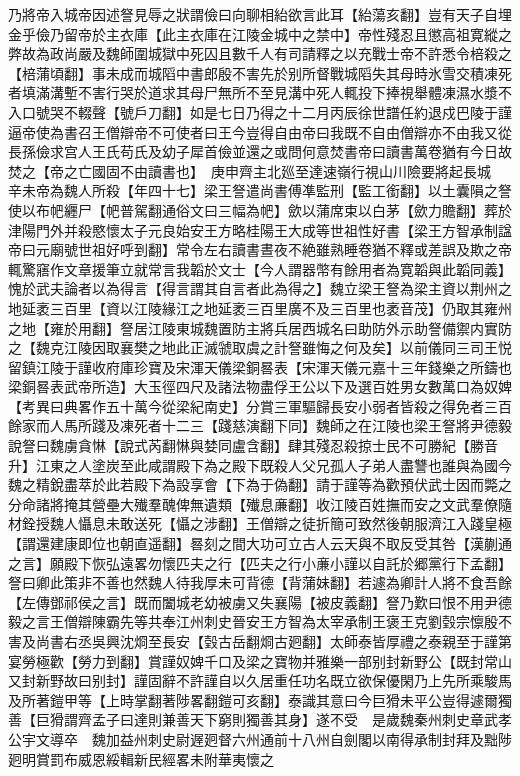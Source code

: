 乃將帝入城帝因述詧見辱之狀謂儉曰向聊相紿欲言此耳【紿蕩亥翻】豈有天子自埋金乎儉乃留帝於主衣庫【此主衣庫在江陵金城中之禁中】帝性殘忍且懲高祖寛縱之弊故為政尚嚴及魏師圍城獄中死囚且數千人有司請釋之以充戰士帝不許悉令棓殺之【棓蒲頃翻】事未成而城䧟中書郎殷不害先於别所督戰城䧟失其母時氷雪交積凍死者填滿溝塹不害行哭於道求其母尸無所不至見溝中死人輒投下捧視舉體凍濕水漿不入口號哭不輟聲【號戶刀翻】如是七日乃得之十二月丙辰徐世譜任約退戍巴陵于謹逼帝使為書召王僧辯帝不可使者曰王今豈得自由帝曰我既不自由僧辯亦不由我又從長孫儉求宫人王氏苟氏及幼子犀首儉並還之或問何意焚書帝曰讀書萬卷猶有今日故焚之【帝之亡國固不由讀書也】　庚申齊主北廵至達速嶺行視山川險要將起長城　辛未帝為魏人所殺【年四十七】梁王詧遣尚書傅凖監刑【監工銜翻】以土囊隕之詧使以布帊纒尸【帊普駕翻通俗文曰三幅為帊】歛以蒲席束以白茅【歛力贍翻】葬於津陽門外并殺愍懷太子元良始安王方略桂陽王大成等世祖性好書【梁王方智承制諡帝曰元廟號世祖好呼到翻】常令左右讀書晝夜不絶雖熟睡卷猶不釋或差誤及欺之帝輒驚窹作文章援筆立就常言我韜於文士【今人謂器幣有餘用者為寛韜與此韜同義】愧於武夫論者以為得言【得言謂其自言者此為得之】魏立梁王詧為梁主資以荆州之地延袤三百里【資以江陵緣江之地延袤三百里廣不及三百里也袤音茂】仍取其雍州之地【雍於用翻】詧居江陵東城魏置防主將兵居西城名曰助防外示助詧備禦内實防之【魏克江陵因取襄樊之地此正滅虢取虞之計詧雖悔之何及矣】以前儀同三司王悦留鎮江陵于謹收府庫珍寶及宋渾天儀梁銅晷表【宋渾天儀元嘉十三年錢樂之所鑄也梁銅晷表武帝所造】大玉徑四尺及諸法物盡俘王公以下及選百姓男女數萬口為奴婢　【考異曰典畧作五十萬今從梁紀南史】分賞三軍驅歸長安小弱者皆殺之得免者三百餘家而人馬所踐及凍死者十二三【踐慈演翻下同】魏師之在江陵也梁王詧將尹德毅說詧曰魏虜貪惏【說式芮翻惏與婪同盧含翻】肆其殘忍殺掠士民不可勝紀【勝音升】江東之人塗炭至此咸謂殿下為之殿下既殺人父兄孤人子弟人盡讐也誰與為國今魏之精銳盡萃於此若殿下為設享會【下為于偽翻】請于謹等為歡預伏武士因而斃之分命諸將掩其營壘大殱羣醜俾無遺類【殱息亷翻】收江陵百姓撫而安之文武羣僚隨材銓授魏人懾息未敢送死【懾之涉翻】王僧辯之徒折簡可致然後朝服濟江入踐皇極【謂還建康即位也朝直遥翻】晷刻之間大功可立古人云天與不取反受其咎【漢蒯通之言】願殿下恢弘遠畧勿懷匹夫之行【匹夫之行小亷小謹以自託於郷黨行下孟翻】詧曰卿此策非不善也然魏人待我厚未可背德【背蒲妹翻】若遽為卿計人將不食吾餘【左傳鄧祁侯之言】既而闔城老幼被虜又失襄陽【被皮義翻】詧乃歎曰恨不用尹德毅之言王僧辯陳霸先等共奉江州刺史晉安王方智為太宰承制王褒王克劉㲄宗懔殷不害及尚書右丞吳興沈烱至長安【㲄古岳翻烱古㢠翻】太師泰皆厚禮之泰親至于謹第宴勞極歡【勞力到翻】賞謹奴婢千口及梁之寶物并雅樂一部别封新野公【既封常山又封新野故曰别封】謹固辭不許謹自以久居重任功名既立欲保優閑乃上先所乘駿馬及所著鎧甲等【上時掌翻著陟畧翻鎧可亥翻】泰識其意曰今巨猾未平公豈得遽爾獨善【巨猾謂齊孟子曰達則兼善天下窮則獨善其身】遂不受　是歲魏秦州刺史章武孝公宇文導卒　魏加益州刺史尉遟㢠督六州通前十八州自劍閣以南得承制封拜及黜陟㢠明賞罰布威恩綏輯新民經畧未附華夷懷之


